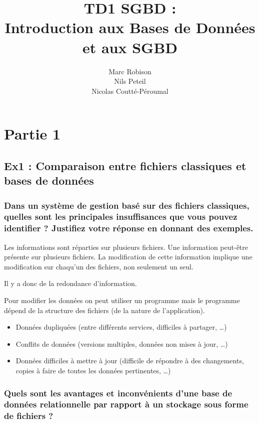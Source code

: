 \documentclass{article}
\title{TD1 SGBD : \\ Introduction aux Bases de Données et aux SGBD}
\author{Marc Robison\\
	Nils Peteil\\
  Nicolas Coutté-Péroumal}
\begin{document}
\maketitle

\tableofcontents 

\section{Partie 1}
\subsection{Ex1 : Comparaison entre fichiers classiques et bases de données}
\subsubsection{Dans un système de gestion basé sur des fichiers classiques, quelles sont les principales insuffisances que vous pouvez identifier ? Justifiez votre réponse en donnant des exemples.} \par \vspace{3mm}

Les informations sont réparties sur plusieurs fichiers. Une information peut-être présente sur plusieurs fichiers. La modification de cette information implique une modification sur chaqu'un des fichiers, non seulement un seul.

Il y a donc de la redondance d'information.

Pour modifier les données on peut utiliser un programme mais le programme dépend de la structure des fichiers (de la nature de l'application).

\begin{itemize}
  \item Données dupliquées (entre différents services, difficiles à partager, …)
  \item Conflits de données (versions multiples, données non mises à jour, …)
  \item Données difficiles à mettre à jour (difficile de répondre à des changements, copies à
faire de toutes les données pertinentes, …)
\end {itemize}


\subsubsection{Quels sont les avantages et inconvénients d’une base de données relationnelle par rapport à un stockage sous forme de fichiers ?}
\vspace{3mm}
\end{document}
